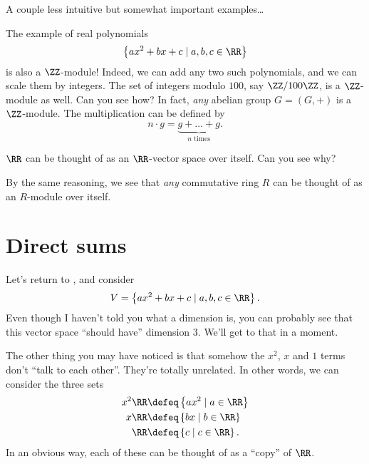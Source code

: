 A couple less intuitive but somewhat important examples\dots
\begin{example}
	\listhack
	\begin{enumerate}[(a)]
		\ii The example of real polynomials
		\[ \left\{ ax^2+bx+c \mid a,b,c \in \RR \right\} \]
		is also a $\ZZ$-module!
		Indeed, we can add any two such polynomials,
		and we can scale them by integers.
		\ii The set of integers modulo $100$, say $\ZZ/100\ZZ$,
		is a $\ZZ$-module as well. Can you see how?
		\ii In fact, \emph{any} abelian group $G = (G,+)$ is a $\ZZ$-module.
		The multiplication can be defined by
		\[ n \cdot g = \underbrace{g+\dots+g}_{\text{$n$ times}}. \]
	\end{enumerate}
\end{example}
\begin{example}
	\listhack
	\begin{enumerate}[(a)]
	\ii $\RR$ can be thought of as an $\RR$-vector space over itself.
	Can you see why?

	\ii By the same reasoning,
	we see that \emph{any} commutative ring $R$ can be thought of
	as an $R$-module over itself.
	\end{enumerate}
\end{example}

\section{Direct sums}
Let's return to , and consider
\[ V = \left\{ ax^2+bx+c \mid a,b,c \in \RR \right\}.  \]
Even though I haven't told you what a dimension is,
you can probably see that this vector space ``should have'' dimension $3$.
We'll get to that in a moment.

The other thing you may have noticed is that somehow
the $x^2$, $x$ and $1$ terms don't ``talk to each other''.
They're totally unrelated.
In other words, we can consider the three sets
\begin{align*}
	x^2\RR &\defeq \left\{ ax^2 \mid a \in \RR \right\} \\
	x\RR &\defeq \left\{ bx \mid b \in \RR \right\} \\
	\RR &\defeq \left\{ c \mid c \in \RR \right\}.
\end{align*}
In an obvious way, each of these can be thought of as a ``copy'' of $\RR$.

